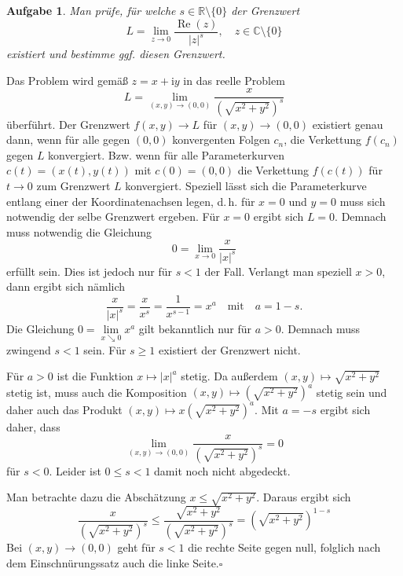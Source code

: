 \documentclass[a4paper,10pt,fleqn,twoside]{scrartcl}
\numberwithin{equation}{section}
\newcommand{\R}{\mathbb R}
\newcommand{\C}{\mathbb C}
\newcommand{\ui}{\mathrm i}
\newcommand{\real}{\operatorname{Re}}
\newcommand{\strong}[1]{{\normalfont\sffamily\bfseries #1}}
\renewcommand{\qedsymbol}{\ensuremath{\square}}
\theoremstyle{Aufgabe}
\newtheorem{Aufgabe}{\sffamily Aufgabe}[section]
\begin{document}
\begin{Aufgabe}
Man prüfe, für welche $s\in\R\setminus\{0\}$ der Grenzwert
\[L = \lim_{z\to 0} \frac{\real(z)}{|z|^s},\quad z\in\C\setminus\{0\}\]
existiert und bestimme ggf. diesen Grenzwert.
\end{Aufgabe}
\noindent\strong{Lösung.} Das Problem wird gemäß $z=x+\ui y$ in das reelle
Problem
\begin{equation}
L = \lim_{(x,y)\to (0,0)} \frac{x}{(\sqrt{x^2+y^2})^s}
\end{equation}
überführt. Der Grenzwert $f(x,y)\to L$ für $(x,y)\to (0,0)$ existiert
genau dann, wenn für alle gegen $(0,0)$ konvergenten Folgen $c_n$, die
Verkettung $f(c_n)$ gegen $L$ konvergiert. Bzw. wenn für alle
Parameterkurven $c(t)=(x(t),y(t))$ mit $c(0)=(0,0)$ die Verkettung
$f(c(t))$ für $t\to 0$ zum Grenzwert $L$ konvergiert. Speziell lässt
sich die Parameterkurve entlang einer der Koordinatenachsen legen,
d.\,h. für $x=0$ und $y=0$ muss sich notwendig der selbe Grenzwert
ergeben. Für $x=0$ ergibt
sich $L=0$. Demnach muss notwendig die Gleichung%
\begin{equation}
0 = \lim_{x\to 0} \frac{x}{|x|^s}
\end{equation}
erfüllt sein. Dies ist jedoch nur für $s<1$ der Fall. Verlangt man
speziell $x>0$, dann ergibt sich nämlich%
\begin{equation}
\frac{x}{|x|^s} = \frac{x}{x^s} = \frac{1}{x^{s-1}}
= x^a\quad\text{mit}\quad a=1-s.
\end{equation}
Die Gleichung $0=\lim\limits_{x\searrow 0} x^a$ gilt bekanntlich nur für
$a>0$. Demnach muss zwingend $s<1$ sein. Für $s\ge 1$ existiert der
Grenzwert nicht.

Für $a>0$ ist die Funktion $x\mapsto |x|^a$ stetig. Da außerdem
$(x,y)\mapsto\sqrt{x^2+y^2}$ stetig ist, muss auch die Komposition
$(x,y)\mapsto (\sqrt{x^2+y^2})^a$ stetig sein und daher auch das
Produkt $(x,y)\mapsto x(\sqrt{x^2+y^2})^a$. Mit $a=-s$ ergibt sich
daher, dass%
\begin{equation}
\lim_{(x,y)\to (0,0)} \frac{x}{(\sqrt{x^2+y^2})^s} = 0
\end{equation}
für $s<0$. Leider ist $0\le s<1$ damit noch nicht abgedeckt.

Man betrachte dazu die Abschätzung $x\le\sqrt{x^2+y^2}$. Daraus
ergibt sich
\begin{equation}
\frac{x}{(\sqrt{x^2+y^2})^s} \le \frac{\sqrt{x^2+y^2}}{(\sqrt{x^2+y^2})^s}
= (\sqrt{x^2+y^2})^{1-s}
\end{equation}
Bei $(x,y)\to (0,0)$ geht für $s<1$ die rechte Seite gegen null,
folglich nach dem Einschnürungssatz auch die linke Seite.\;\qedsymbol
\end{document}
